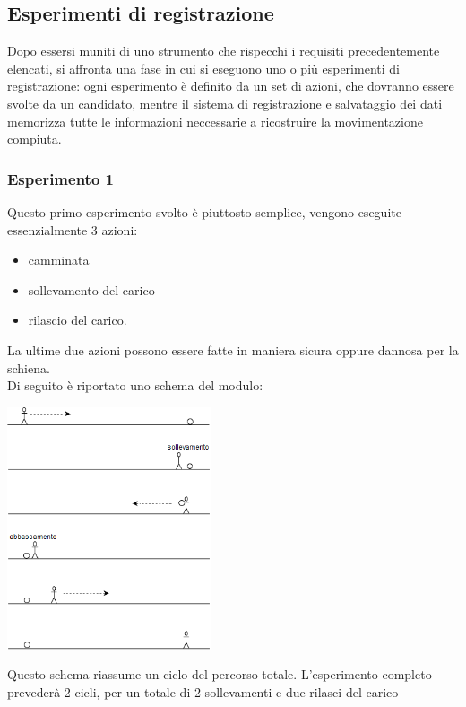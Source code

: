\documentclass[a4paper]{article}
\begin{document}
\makebox[\linewidth]{}


	\subsection{Esperimenti di registrazione}
Dopo essersi muniti di uno strumento che rispecchi i requisiti precedentemente elencati, si  affronta una fase in cui si eseguono uno o più esperimenti di registrazione: ogni esperimento è definito da un set di azioni, che dovranno essere svolte da un candidato, mentre il sistema di registrazione e salvataggio dei dati memorizza tutte le informazioni neccessarie a ricostruire la movimentazione compiuta.

	\subsubsection{Esperimento 1}
Questo primo esperimento svolto è piuttosto semplice, vengono eseguite essenzialmente 3 azioni:
\begin {itemize}
\item camminata
\item sollevamento del carico 
\item rilascio del carico.
\end{itemize}
La ultime due azioni possono essere fatte in maniera sicura oppure dannosa per la schiena. \\
Di seguito è riportato uno schema del modulo:\\

\makebox[\linewidth]{}
\begin{minipage}{\linewidth}
\begin{center}
\includegraphics[width=60mm,scale=0.7]{./images/esperimento1.png} 
\makebox[\linewidth]{}
\end{center}
\end{minipage}
\makebox[\linewidth]{} 
\makebox[\linewidth]{}
\makebox[\linewidth]{}
Questo schema riassume un ciclo del percorso totale. L’esperimento completo prevederà 2 cicli, per un totale di 2 sollevamenti e due rilasci del carico\\
\end{document}
